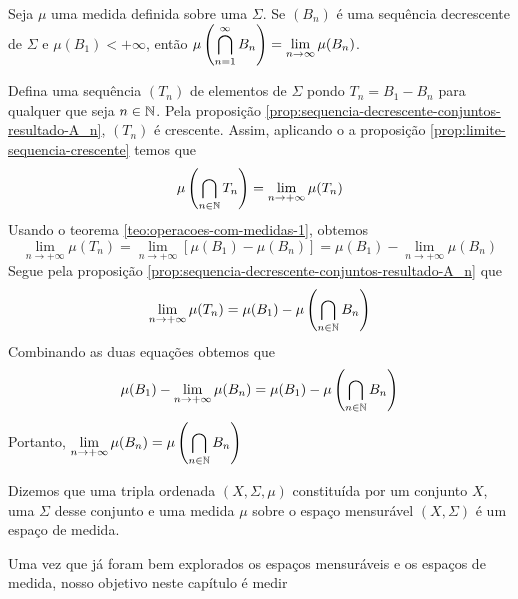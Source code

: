\begin{proposition}
Seja $\mu$ uma medida definida sobre uma \sigal $\Sigma$.
Se $(B_n)$ é uma sequência decrescente de $\Sigma$ e $\mu(B_1) < +\infty$, então 
$\mu\left(\displaystyle \bigcap_{n = 1}^\infty B_n\right) = \displaystyle \lim_{n \to \infty} \mu(B_n)$.
\end{proposition} 
\begin{prova}
    Defina uma sequência $(T_n)$ de elementos de $\Sigma$ pondo $T_n = B_1 - B_n$ para qualquer que seja $n \in \operatorname{\mathbb{N}}$.
    Pela proposição \ref{prop:sequencia-decrescente-conjuntos-resultado-A_n}, $(T_n)$ é crescente.
    Assim, aplicando o a proposição \ref{prop:limite-sequencia-crescente} temos que 
    $$
    \mu\left(\bigcap_{n \in \operatorname{\mathbb{N}}} T_n\right) = \lim_{n \to +\infty} \mu(T_n)
    $$
    Usando o teorema \ref{teo:operacoes-com-medidas-1}, obtemos
    $$
    \lim_{n \to +\infty} \mu(T_n) = \lim_{n \to +\infty} [\mu(B_1) - \mu(B_n)] = \mu(B_1) - \lim_{n \to +\infty} \mu(B_n)
    $$
    Segue pela proposição \ref{prop:sequencia-decrescente-conjuntos-resultado-A_n} que 
    $$
    \lim_{n \to +\infty} \mu(T_n) = \mu(B_1) - \mu\left(\bigcap_{n \in \operatorname{\mathbb{N}}} B_n\right)
    $$
    Combinando as duas equações obtemos que
    \begin{align*}
        \mu(B_1) - \lim_{n \to +\infty} \mu(B_n) = \mu(B_1) - \mu\left(\bigcap_{n \in \operatorname{\mathbb{N}}} B_n\right)
    \end{align*}
    Portanto, $\displaystyle \lim_{n \to +\infty} \mu(B_n) = \mu\left(\bigcap_{n \in \operatorname{\mathbb{N}}} B_n\right)$
\end{prova}


\begin{definition}
    Dizemos que uma tripla ordenada $(X, \Sigma, \mu)$ constituída por um conjunto $X$, uma \sigal $\Sigma$ desse conjunto e uma medida $\mu$ sobre o espaço mensurável $(X, \Sigma)$ é um espaço de medida.
\end{definition}

Uma vez que já foram bem explorados os espaços mensuráveis e os espaços de medida, nosso objetivo neste capítulo é medir 